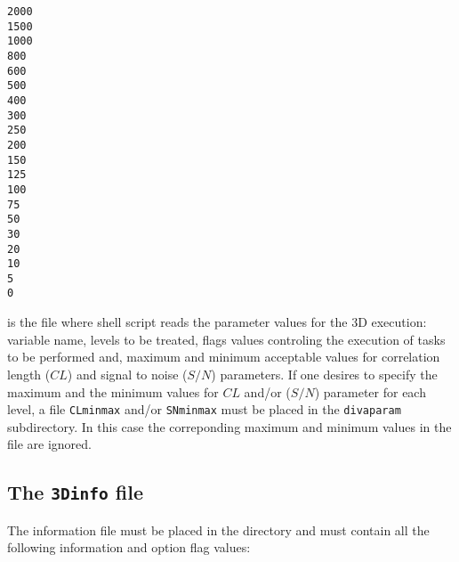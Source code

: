 {\begin{center}
\begin{exfile}[H] %
\begin{footnotesize}
\begin{verbatim}
2000
1500
1000
800
600
500
400
300
250
200
150
125
100
75
50
30
20
10
5
0
\end{verbatim}
\end{footnotesize}
\caption{}
\label{contdepthfile}
\end{exfile}

\end{center}


\underline{} is the file where shell script reads the parameter values for the 3D execution: variable name, levels to be treated, flags values controling the execution of tasks to be performed and, maximum and minimum acceptable values for correlation length ($CL$) and signal to noise ($S/N$) parameters. If one desires to specify the maximum and the minimum values for $CL$  and/or ($S/N$) parameter for each level, a file \texttt{CLminmax} and/or \texttt{SNminmax} must be placed in the \texttt{divaparam} subdirectory. In this case the correponding maximum and minimum values in the  file are ignored.\\



\subsection{The \texttt{3Dinfo} file \label{sec:3Dinfo}}

The information file  must be placed in the  directory and must contain all the following information and option flag values:

}
